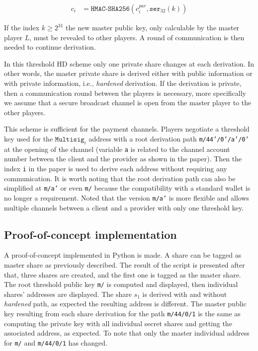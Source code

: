 \begin{equation}
\begin{split}
  c_i &= \texttt{HMAC-SHA256}(c_i^{par}, \texttt{ser}_{32}(k))
\end{split}
\end{equation}

If the index $k \geq 2^{31}$ the new master public key, only calculable by the
master player $L$, must be revealed to other players. A round of communication
is then needed to continue derivation.

In this threshold HD scheme only one private share changes at each derivation. In
other words, the master private share is derived either with public information
or with private information, i.e., \textit{hardened} derivation. If the
derivation is private, then a communication round between the players is
necessary, more specifically we assume that a secure broadcast channel is open
from the master player to the other players.

This scheme is sufficient for the payment channels. Players negotiate a
threshold key used for the $\texttt{Multisig}_i$ address with a root derivation
path \texttt{m/44'/0'/a'/0'} at the opening of the channel (variable \texttt{a}
is related to the channel account number between the client and the provider as
shown in the paper). Then the index \texttt{i} in the paper is used to derive
each address without requiring any communication. It is worth noting that the
root derivation path can also be simplified at \texttt{m/a'} or even \texttt{m/}
because the compatibility with a standard wallet is no longer a requirement.
Noted that the version \texttt{m/a'} is more flexible and allows multiple
channels between a client and a provider with only one threshold key.

\subsection{Proof-of-concept implementation}

A proof-of-concept implemented in Python is made. A share can be tagged as
master share as previously described. The result of the script is presented
after that, three shares are created, and the first one is tagged as the master
share. The root threshold public key \texttt{m/} is computed and displayed, then
individual shares' addresses are displayed. The share $s_1$ is derived with and
without \textit{hardened} path, as expected the resulting address is different.
The master public key resulting from each share derivation for the path
\texttt{m/44/0/1} is the same as computing the private key with all individual
secret shares and getting the associated address, as expected. To note that only
the master individual address for \texttt{m/} and \texttt{m/44/0/1} has changed.


